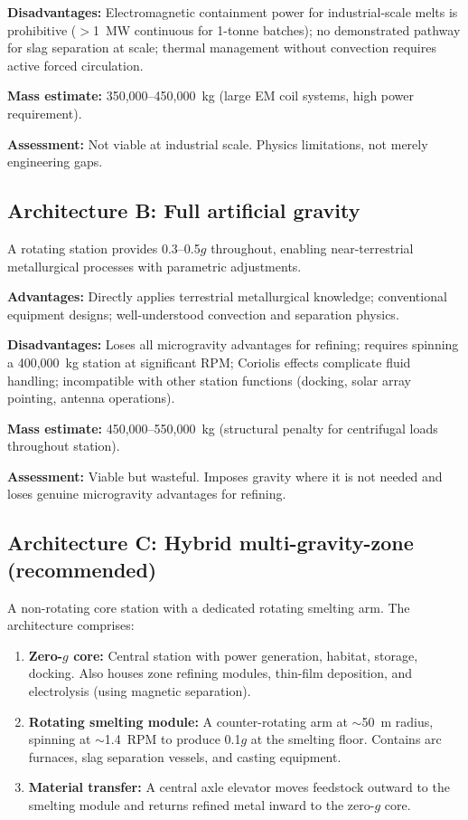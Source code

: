 \documentclass[preprint,12pt]{elsarticle}
\begin{document}
\textbf{Disadvantages:} Electromagnetic containment power for industrial-scale melts is prohibitive ($>$1~MW continuous for 1-tonne batches); no demonstrated pathway for slag separation at scale; thermal management without convection requires active forced circulation.

\textbf{Mass estimate:} 350,000--450,000~kg (large EM coil systems, high power requirement).

\textbf{Assessment:} Not viable at industrial scale. Physics limitations, not merely engineering gaps.

\subsection{Architecture B: Full artificial gravity}

A rotating station \cite{hall2006} provides 0.3--0.5$g$ throughout, enabling near-terrestrial metallurgical processes with parametric adjustments.

\textbf{Advantages:} Directly applies terrestrial metallurgical knowledge; conventional equipment designs; well-understood convection and separation physics.

\textbf{Disadvantages:} Loses all microgravity advantages for refining; requires spinning a 400,000~kg station at significant RPM; Coriolis effects complicate fluid handling; incompatible with other station functions (docking, solar array pointing, antenna operations).

\textbf{Mass estimate:} 450,000--550,000~kg (structural penalty for centrifugal loads throughout station).

\textbf{Assessment:} Viable but wasteful. Imposes gravity where it is not needed and loses genuine microgravity advantages for refining.

\subsection{Architecture C: Hybrid multi-gravity-zone (recommended)}

A non-rotating core station with a dedicated rotating smelting arm. The architecture comprises:

\begin{enumerate}
    \item \textbf{Zero-$g$ core:} Central station with power generation, habitat, storage, docking. Also houses zone refining modules, thin-film deposition, and electrolysis (using magnetic separation).
    \item \textbf{Rotating smelting module:} A counter-rotating arm at $\sim$50~m radius, spinning at $\sim$1.4~RPM to produce 0.1$g$ at the smelting floor. Contains arc furnaces, slag separation vessels, and casting equipment.
    \item \textbf{Material transfer:} A central axle elevator moves feedstock outward to the smelting module and returns refined metal inward to the zero-$g$ core.
\end{enumerate}
\end{document}
